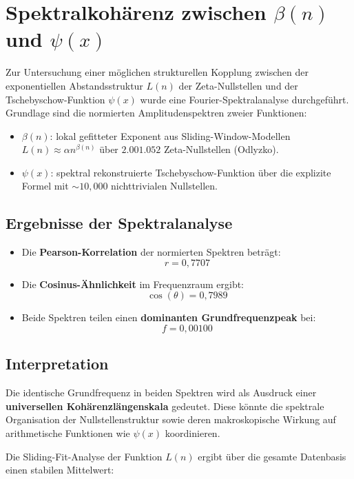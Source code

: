 \section{Spektralkohärenz zwischen \texorpdfstring{$\beta(n)$}{beta(n)} und \texorpdfstring{$\psi(x)$}{psi(x)}}

Zur Untersuchung einer möglichen strukturellen Kopplung zwischen der exponentiellen Abstandsstruktur $L(n)$ der Zeta-Nullstellen und der Tschebyschow-Funktion $\psi(x)$ wurde eine Fourier-Spektralanalyse durchgeführt. Grundlage sind die normierten Amplitudenspektren zweier Funktionen:

\begin{itemize}
  \item $\beta(n)$: lokal gefitteter Exponent aus Sliding-Window-Modellen $L(n) \approx \alpha n^{\beta(n)}$ über $2{.}001{.}052$ Zeta-Nullstellen (Odlyzko).
  \item $\psi(x)$: spektral rekonstruierte Tschebyschow-Funktion über die explizite Formel mit $\sim 10{,}000$ nichttrivialen Nullstellen.
\end{itemize}

\subsection*{Ergebnisse der Spektralanalyse}

\begin{itemize}
  \item Die \textbf{Pearson-Korrelation} der normierten Spektren beträgt:
  \[
  r = 0{,}7707
  \]
  \item Die \textbf{Cosinus-Ähnlichkeit} im Frequenzraum ergibt:
  \[
  \cos(\theta) = 0{,}7989
  \]
  \item Beide Spektren teilen einen \textbf{dominanten Grundfrequenzpeak} bei:
  \[
  f = 0{,}00100
  \]
\end{itemize}

\subsection*{Interpretation}

Die identische Grundfrequenz in beiden Spektren wird als Ausdruck einer \textbf{universellen Kohärenzlängenskala} gedeutet. Diese könnte die spektrale Organisation der Nullstellenstruktur sowie deren makroskopische Wirkung auf arithmetische Funktionen wie $\psi(x)$ koordinieren.

Die Sliding-Fit-Analyse der Funktion $L(n)$ ergibt über die gesamte Datenbasis einen stabilen Mittelwert:

